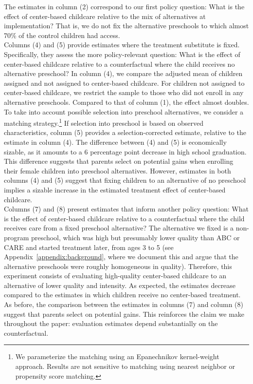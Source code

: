 \noindent The estimates in column (2) correspond to our first policy question: What is the effect of center-based childcare relative to the mix of alternatives at implementation? That is, we do not fix the alternative preschools to which almost 70\% of the control children had access.\\

\noindent Columns (4) and (5) provide estimates where the treatment substitute is fixed. Specifically, they assess the more policy-relevant question: What is the effect of center-based childcare relative to a counterfactual where the child receives no alternative preschool? In column (4), we compare the adjusted mean of children assigned and not assigned to center-based childcare. For children not assigned to center-based childcare, we restrict the sample to those who did not enroll in any alternative preschools. Compared to that of column (1), the effect almost doubles. To take into account possible selection into preschool alternatives, we consider a matching strategy.\footnote{We parameterize the matching using an Epanechnikov kernel-weight approach. Results are not sensitive to matching using nearest neighbor or propensity score matching.} If selection into preschool is based on observed characteristics, column (5) provides a selection-corrected estimate, relative to the estimate in column (4). The difference between (4) and (5) is economically sizable, as it amounts to a 6 percentage point decrease in high school graduation. This difference suggests that parents select on potential gains when enrolling their female children into preschool alternatives. However, estimates in both columns (4) and (5) suggest that fixing children to an alternative of no preschool implies a sizable increase in the estimated treatment effect of center-based childcare. \\

\noindent Columns (7) and (8) present estimates that inform another policy question: What is the effect of center-based childcare relative to a counterfactual where the child receives care from a fixed preschool alternative? The alternative we fixed is a non-program preschool, which was high but  presumably lower quality than ABC or CARE and started treatment later, from ages 3 to 5 (see Appendix~\ref{appendix:background}, where we document this and argue that the alternative preschools were roughly homogeneous in quality). Therefore, this experiment consists of evaluating high-quality center-based childcare to an alternative of lower quality and intensity. As expected, the estimates decrease compared to the estimates in which children receive no center-based treatment. As before, the comparison between the estimates in columns (7) and column (8) suggest that parents select on potential gains. This reinforces the claim we make throughout the paper: evaluation estimates depend substantially on the counterfactual.\\

